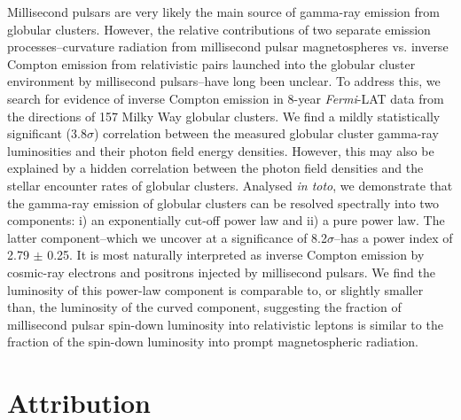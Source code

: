 \documentclass[doublespace,nopageskip]{VTthesis} %
\begin{document}
Millisecond pulsars are very likely the main source of gamma-ray emission from globular clusters. However, the relative contributions of two separate emission processes--curvature radiation from millisecond pulsar magnetospheres vs. inverse Compton emission from relativistic pairs launched into the globular cluster environment by millisecond pulsars--have long been unclear. To address this, we search for evidence of inverse Compton emission in 8-year \textit{Fermi}-LAT data from the directions of 157 Milky Way globular clusters. We find a mildly statistically significant (3.8$\sigma$) correlation between the measured globular cluster gamma-ray luminosities and their photon field energy densities. However, this may also be explained by a hidden correlation between the photon field densities and the stellar encounter rates of globular clusters. Analysed {\it in toto},  we demonstrate that the gamma-ray emission of globular clusters can be resolved spectrally into two components:  i) an exponentially cut-off power law and ii) a pure power law. The latter component--which we uncover at a significance of 8.2$\sigma$--{has a power index of 2.79 $\pm$ 0.25. It} is most naturally interpreted as inverse Compton emission by cosmic-ray electrons and positrons injected by millisecond pulsars. We find the luminosity of this {power-law} component is comparable to, or slightly smaller than, the luminosity of the curved component, suggesting the fraction of millisecond pulsar spin-down luminosity into relativistic leptons is similar to the fraction of the spin-down luminosity into prompt magnetospheric radiation.

\section{Attribution}
\end{document}
